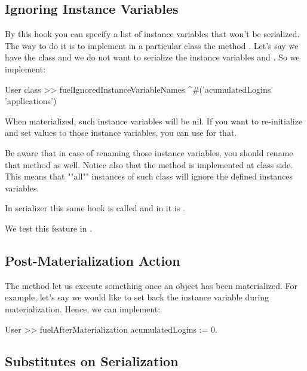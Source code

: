 \documentclass[a4paper,10pt,twoside]{book}
\begin{document}
\subsection{Ignoring Instance Variables}

By this hook you can specify a list of instance variables that won't be serialized. The way to do it is to implement in a particular class the method . Let's say we have the class  and we do not want to serialize the instance variables  and . So we implement:

\begin{code}
User class >> fuelIgnoredInstanceVariableNames
    ^#('acumulatedLogins' 'applications')
\end{code}

When materialized, such instance variables will be nil. If you want to re-initialize and set values to those instance variables, you can use  for that.

Be aware that in case of renaming those instance variables, you should rename that method as well. Notice also that the method  is implemented at class side. This means that ""all"" instances of such class will ignore the defined instances variables. 

In  serializer this same hook is called  and in  it is . 

We test this feature in .


\subsection{Post-Materialization Action}

The method  let us execute something once an object has been materialized. For example, let's say we would like to set back the instance variable  during materialization. Hence, we can implement:

\begin{code}
User >> fuelAfterMaterialization
 acumulatedLogins := 0. 
\end{code}


\subsection{Substitutes on Serialization}
\end{document}
